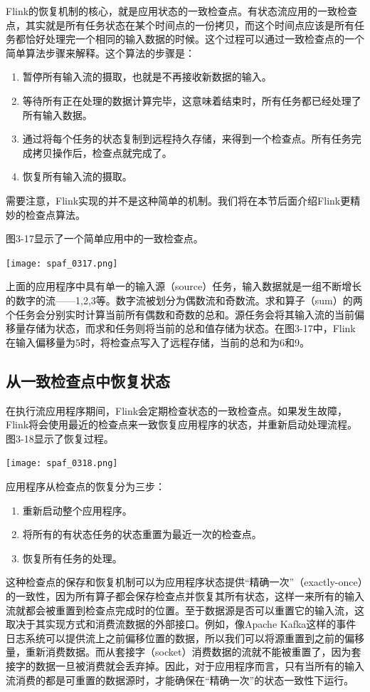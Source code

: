 \documentclass[oneside]{ctexbook}
\begin{document}
Flink的恢复机制的核心，就是应用状态的一致检查点。有状态流应用的一致检查点，其实就是所有任务状态在某个时间点的一份拷贝，而这个时间点应该是所有任务都恰好处理完一个相同的输入数据的时候。这个过程可以通过一致检查点的一个简单算法步骤来解释。这个算法的步骤是：

\begin{enumerate}
  \item 暂停所有输入流的摄取，也就是不再接收新数据的输入。
  \item 等待所有正在处理的数据计算完毕，这意味着结束时，所有任务都已经处理了所有输入数据。
  \item 通过将每个任务的状态复制到远程持久存储，来得到一个检查点。所有任务完成拷贝操作后，检查点就完成了。
  \item 恢复所有输入流的摄取。
\end{enumerate}

需要注意，Flink实现的并不是这种简单的机制。我们将在本节后面介绍Flink更精妙的检查点算法。

图3-17显示了一个简单应用中的一致检查点。

\noindent \texttt{[image: spaf\_0317.png]}

上面的应用程序中具有单一的输入源（source）任务，输入数据就是一组不断增长的数字的流——1,2,3等。数字流被划分为偶数流和奇数流。求和算子（sum）的两个任务会分别实时计算当前所有偶数和奇数的总和。源任务会将其输入流的当前偏移量存储为状态，而求和任务则将当前的总和值存储为状态。在图3-17中，Flink在输入偏移量为5时，将检查点写入了远程存储，当前的总和为6和9。

\subsection{从一致检查点中恢复状态}

在执行流应用程序期间，Flink会定期检查状态的一致检查点。如果发生故障，Flink将会使用最近的检查点来一致恢复应用程序的状态，并重新启动处理流程。图3-18显示了恢复过程。

\noindent \texttt{[image: spaf\_0318.png]}

应用程序从检查点的恢复分为三步：

\begin{enumerate}
  \item 重新启动整个应用程序。
  \item 将所有的有状态任务的状态重置为最近一次的检查点。
  \item 恢复所有任务的处理。
\end{enumerate}

\sloppy
这种检查点的保存和恢复机制可以为应用程序状态提供“精确一次”（exactly-once）的一致性，因为所有算子都会保存检查点并恢复其所有状态，这样一来所有的输入流就都会被重置到检查点完成时的位置。至于数据源是否可以重置它的输入流，这取决于其实现方式和消费流数据的外部接口。例如，像Apache Kafka这样的事件日志系统可以提供流上之前偏移位置的数据，所以我们可以将源重置到之前的偏移量，重新消费数据。而从套接字（socket）消费数据的流就不能被重置了，因为套接字的数据一旦被消费就会丢弃掉。因此，对于应用程序而言，只有当所有的输入流消费的都是可重置的数据源时，才能确保在“精确一次”的状态一致性下运行。
\end{document}
